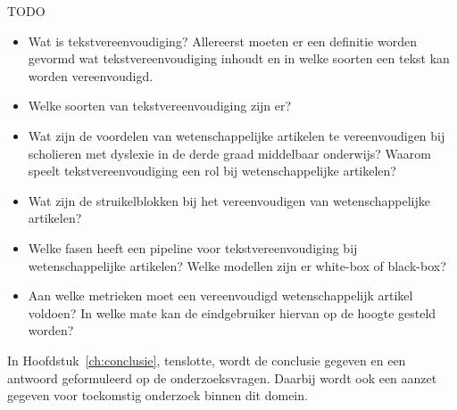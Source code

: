 TODO
\begin{itemize}
	\item Wat is tekstvereenvoudiging? Allereerst moeten er een definitie worden gevormd wat tekstvereenvoudiging inhoudt en in welke soorten een tekst kan worden vereenvoudigd. 
	\item Welke soorten van tekstvereenvoudiging zijn er?
	\item Wat zijn de voordelen van wetenschappelijke artikelen te vereenvoudigen bij scholieren met dyslexie in de derde graad middelbaar onderwijs? Waarom speelt tekstvereenvoudiging een rol bij wetenschappelijke artikelen?
	\item Wat zijn de struikelblokken bij het vereenvoudigen van wetenschappelijke artikelen?
	\item Welke fasen heeft een pipeline voor tekstvereenvoudiging bij wetenschappelijke artikelen? Welke modellen zijn er white-box of black-box?
	\item Aan welke metrieken moet een vereenvoudigd wetenschappelijk artikel voldoen? In welke mate kan de eindgebruiker hiervan op de hoogte gesteld worden? 
\end{itemize}

In Hoofdstuk~\ref{ch:conclusie}, tenslotte, wordt de conclusie gegeven en een antwoord geformuleerd op de onderzoeksvragen. Daarbij wordt ook een aanzet gegeven voor toekomstig onderzoek binnen dit domein.